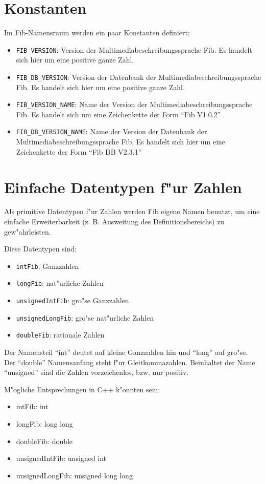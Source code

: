 \section{Konstanten}

Im Fib-Namensraum werden ein paar Konstanten definiert:
\begin{itemize}
 \item \verb|FIB_VERSION|: Version der Multimediabeschreibungssprache Fib. Es handelt sich hier um eine positive ganze Zahl.
 \item \verb|FIB_DB_VERSION|: Version der Datenbank der Multimediabeschreibungssprache Fib. Es handelt sich hier um eine positive ganze Zahl.
 \item \verb|FIB_VERSION_NAME|: Name der Version der Multimediabeschreibungssprache Fib. Es handelt sich um eine Zeichenkette der Form ``Fib V1.0.2'' .
 \item \verb|FIB_DB_VERSION_NAME|: Name der Version der Datenbank der Multimediabeschreibungssprache Fib. Es handelt sich hier um eine Zeichenkette der Form ``Fib DB V2.3.1''
\end{itemize}


\section{Einfache Datentypen f"ur Zahlen}

Als primitive Datentypen f"ur Zahlen werden Fib eigene Namen benutzt, um eine einfache Erweiterbarkeit (z. B. Ausweitung des Definitionsbereichs) zu gew"ahrleisten.

\bigskip\noindent
Diese Datentypen sind:
\begin{itemize}
 \item \verb|intFib|: Ganzzahlen
 \item \verb|longFib|: nat"urliche Zahlen
 \item \verb|unsignedIntFib|: gro"se Ganzzahlen
 \item \verb|unsignedLongFib|: gro"se nat"urliche Zahlen
 \item \verb|doubleFib|: rationale Zahlen
\end{itemize}
Der Namensteil ``int'' deutet auf kleine Ganzzahlen hin und ``long'' auf gro"se. Der ``double'' Namensanfang steht f"ur Gleitkommazahlen. Beinhaltet der Name ``unsigned'' sind die Zahlen vorzeichenlos, bzw. nur positiv.

\bigskip\noindent
M"ogliche Entsprechungen in C++ k"onnten sein:
\begin{itemize}
 \item intFib: int
 \item longFib: long long
 \item doubleFib: double
 \item unsignedIntFib: unsigned int
 \item unsignedLongFib: unsigned long long
\end{itemize}



